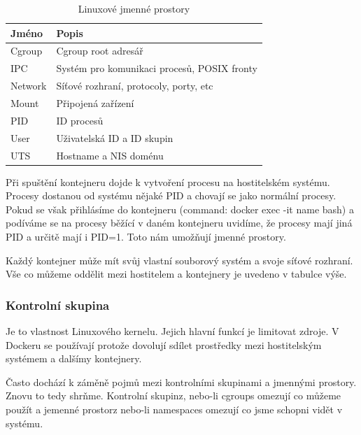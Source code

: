 \begin{table}[h!]
  \begin{center}
	\caption{Linuxové jmenné prostory}
    \label{tab:Jmenne prostory}
    \begin{tabular}{|l|l|} 
    	  \hline
      \textbf{Jméno} & \textbf{Popis} \\
      \hline

	  Cgroup  &  Cgroup root adresář\\
	  IPC     &  Systém pro komunikaci procesů, POSIX fronty\\
	  Network &  Síťové rozhraní, protocoly, porty, etc\\
      Mount   &  Připojená zařízení\\
      PID     &  ID procesů\\
      User    &  Uživatelská ID a ID skupin\\
      UTS     &  Hostname a NIS doménu\\   
      
      \hline
    \end{tabular}
  \end{center}
\end{table}

Při spuštění kontejneru dojde k vytvoření procesu na hostitelském systému. Procesy dostanou od systému nějaké PID a chovají se jako normální procesy. Pokud se však přihlásíme do kontejneru (command: docker exec -it name bash) a podíváme se na procesy běžící v daném kontejneru uvidíme, že procesy mají jiná PID a určitě mají i PID=1. Toto nám umožňují jmenné prostory.

Každý kontejner může mít svůj vlastní souborový systém a svoje síťové rozhraní. Vše co můžeme oddělit mezi hostitelem a kontejnery je uvedeno v tabulce výše. 

\subsubsection{Kontrolní skupina}

Je to vlastnost Linuxového kernelu. Jejich hlavní funkcí je limitovat zdroje. V Dockeru se používají protože dovolují sdílet prostředky mezi hostitelským systémem a dalšímy kontejnery. 

Často dochází k záměně pojmů mezi kontrolními skupinami a jmennými prostory. Znovu to tedy shrňme. Kontrolní skupinz, nebo-li cgroups omezují co můžeme použít a jemenné prostorz nebo-li namespaces omezují co jsme schopni vidět v systému. 

